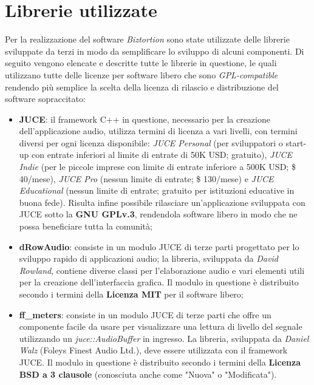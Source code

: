 \section{Librerie utilizzate}
Per la realizzazione del software \textit{Biztortion} sono state utilizzate delle librerie sviluppate da terzi in modo da semplificare lo sviluppo di alcuni componenti. Di seguito vengono elencate e descritte tutte le librerie in questione, le quali utilizzano tutte delle licenze per software libero che sono \textit{GPL-compatible} rendendo più semplice la scelta della licenza di rilascio e distribuzione del software sopraccitato:
\begin{itemize}
    \item \textbf{JUCE}: il framework C++ in questione, necessario per la creazione dell'applicazione audio, utilizza termini di licenza a vari livelli, con termini diversi per ogni licenza disponibile: \textit{JUCE Personal} (per sviluppatori o start-up con entrate inferiori al limite di entrate di 50K USD; gratuito), \textit{JUCE Indie} (per le piccole imprese con limite di entrate inferiore a 500K USD; \$ 40/mese), \textit{JUCE Pro} (nessun limite di entrate; \$ 130/mese) e \textit{JUCE Educational} (nessun limite di entrate; gratuito per istituzioni educative in buona fede). Risulta infine possibile rilasciare un'applicazione sviluppata con JUCE sotto la \textbf{GNU GPLv.3}, rendendola software libero in modo che ne possa beneficiare tutta la comunità;
    \item \textbf{dRowAudio}: consiste in un modulo JUCE di terze parti progettato per lo sviluppo rapido di applicazioni audio; la libreria, sviluppata da \textit{David Rowland}, contiene diverse classi per l'elaborazione audio e vari elementi utili per la creazione dell'interfaccia grafica. Il modulo in questione è distribuito secondo i termini della \textbf{Licenza MIT} per il software libero;
    \item \textbf{ff\_meters}: consiste in un modulo JUCE di terze parti che offre un componente facile da usare per visualizzare una lettura di livello del segnale utilizzando un \textit{juce::AudioBuffer} in ingresso. La libreria, sviluppata da \textit{Daniel Walz} (Foleys Finest Audio Ltd.), deve essere utilizzata con il framework JUCE. Il modulo in questione è distribuito secondo i termini della \textbf{Licenza BSD a 3 clausole} (conosciuta anche come "Nuova" o "Modificata").
\end{itemize}

